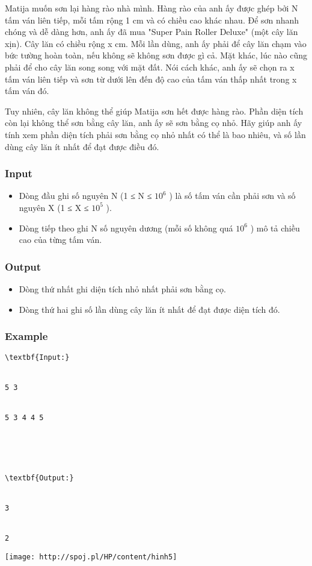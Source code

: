 



   Matija muốn sơn lại hàng rào nhà mình. Hàng rào của anh ấy được ghép bởi N tấm ván liên tiếp, mỗi tấm rộng 1 cm và có chiều cao khác nhau. Để sơn nhanh chóng và dễ dàng hơn, anh ấy đã mua "Super Pain Roller Deluxe" (một cây lăn xịn). Cây lăn có chiều rộng x cm. Mỗi lần dùng, anh ấy phải để cây lăn chạm vào bức tường hoàn toàn, nếu không sẽ không sơn được gì cả. Mặt khác, lúc nào cũng phải để cho cây lăn song song với mặt đất. Nói cách khác, anh ấy sẽ chọn ra x tấm ván liên tiếp và sơn từ dưới lên đến độ cao của tấm ván thấp nhất trong x tấm ván đó.  

   Tuy nhiên, cây lăn không thể giúp Matija sơn hết được hàng rào. Phần diện tích còn lại không thể sơn bằng cây lăn, anh ấy sẽ sơn bằng cọ nhỏ. Hãy giúp anh ấy tính xem phần diện tích phải sơn bằng cọ nhỏ nhất có thể là bao nhiêu, và số lần dùng cây lăn ít nhất để đạt được điều đó.  

\subsubsection{   Input  }
\begin{itemize}
	\item     Dòng đầu ghi số nguyên N (1 ≤ N ≤ $10^{6}$    ) là số tấm ván cần phải sơn và số nguyên X (1 ≤ X ≤ $10^{5}$    ).   
	\item     Dòng tiếp theo ghi N số nguyên dương (mỗi số không quá $10^{6}$    ) mô tả chiều cao của từng tấm ván.   
\end{itemize}

\subsubsection{   Output  }
\begin{itemize}
	\item     Dòng thứ nhất ghi diện tích nhỏ nhất phải sơn bằng cọ.   
	\item     Dòng thứ hai ghi số lần dùng cây lăn ít nhất để đạt được diện tích đó.   
\end{itemize}

\subsubsection{   Example  }
\begin{verbatim}
\textbf{Input:}


5 3


5 3 4 4 5





\textbf{Output:}


3


2\end{verbatim}


\texttt{[image: http://spoj.pl/HP/content/hinh5]}
